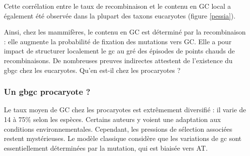 \documentclass[11pt, oneside]{scrartcl}
\begin{document}
Cette corrélation entre le taux de recombinaison et le contenu en GC local a
également été observée dans la plupart des taxons
eucaryotes\cite{pessia_evidence_2012} (figure \ref{pessia}).

\begin{transition}
  Ainsi, chez les mammifères, le contenu en GC est déterminé par la
  recombinaison : elle augmente la probabilité de fixation des mutations vers
  GC. Elle a pour impact de structurer localement le \ac{gc} au gré des épisodes
  de points chauds de recombinaisons. De nombreuses preuves indirectes attestent
  de l'existence du \ac{gbgc} chez les eucaryotes. Qu'en est-il chez les
  procaryotes ?
\end{transition}



\subsubsection{Un \ac{gbgc} procaryote ?}
\label{sec:orgheadline13}
Le taux moyen de GC chez les procaryotes est extrêmement diversifié : il varie
de 14 à 75\% selon les espèces. Certains auteurs y voient une adaptation aux
conditions environnementales\cite{foerstner_environments_2005}. Cependant, les
pressions de sélection associées restent mystérieuses. Le modèle classique
considère que les variations de \ac{gc} sont essentiellement déterminées par la
mutation, qui est biaisée vers
AT\cite{hershberg_evidence_2010,sueoka_directional_1988}.
\end{document}
